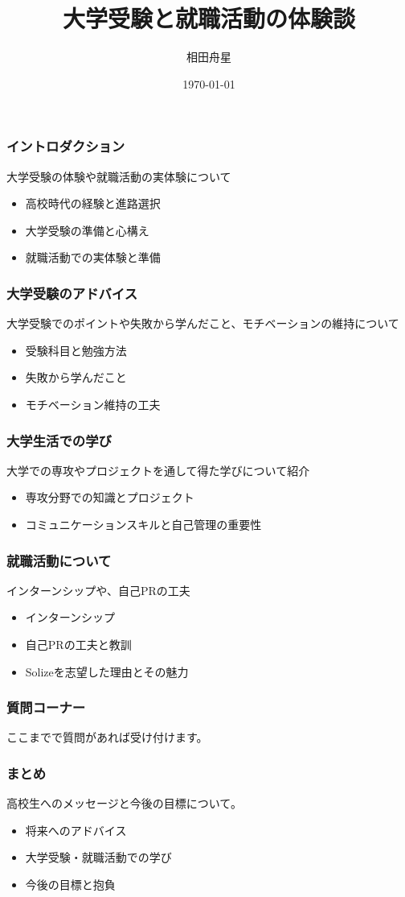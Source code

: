 \documentclass{beamer}
\title{大学受験と就職活動の体験談}
\author{相田舟星}
\date{\today}
\begin{document}
\frame{\titlepage}

\begin{frame}
    \frametitle{イントロダクション}
    大学受験の体験や就職活動の実体験について
    \begin{itemize}
        \item 高校時代の経験と進路選択
        \item 大学受験の準備と心構え
        \item 就職活動での実体験と準備
    \end{itemize}
\end{frame}

\begin{frame}
    \frametitle{大学受験のアドバイス}
    大学受験でのポイントや失敗から学んだこと、モチベーションの維持について
    \begin{itemize}
        \item 受験科目と勉強方法
        \item 失敗から学んだこと
        \item モチベーション維持の工夫
    \end{itemize}
\end{frame}

\begin{frame}
    \frametitle{大学生活での学び}
    大学での専攻やプロジェクトを通して得た学びについて紹介
    \begin{itemize}
        \item 専攻分野での知識とプロジェクト
        \item コミュニケーションスキルと自己管理の重要性
    \end{itemize}
\end{frame}

\begin{frame}
    \frametitle{就職活動について}
    インターンシップや、自己PRの工夫
    \begin{itemize}
        \item インターンシップ
        \item 自己PRの工夫と教訓
        \item Solizeを志望した理由とその魅力
    \end{itemize}
\end{frame}

\begin{frame}
    \frametitle{質問コーナー}
    ここまでで質問があれば受け付けます。
\end{frame}

\begin{frame}
    \frametitle{まとめ}
    高校生へのメッセージと今後の目標について。
    \begin{itemize}
        \item 将来へのアドバイス
        \item 大学受験・就職活動での学び
        \item 今後の目標と抱負
    \end{itemize}
\end{frame}
\end{document}
